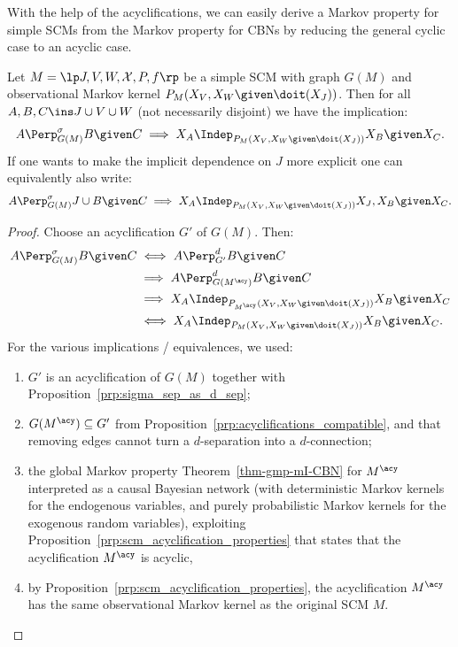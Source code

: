 With the help of the acyclifications,
we can easily derive a Markov property for simple SCMs from the Markov property for CBNs by reducing
the general cyclic case to an acyclic case.
\begin{Cor}\label{cor:gmp_simple_scm}
  Let $M = \lt \Sin, \Send, \Srnd, \CX, P, f \rt$ be a simple SCM with graph $G(M)$
  and observational Markov kernel $P_{M}(X_V,X_W \given \doit(X_J))$.
  Then for all $A, B, C \ins J \cup V \cup W$ (not necessarily disjoint) we have the implication:
  $$A \Perp^\sigma_{G(M)} B \given C \implies X_A \Indep_{P_{M}(X_V,X_W \given \doit(\XJ))} X_B \given X_C.$$
  If one wants to make the implicit dependence on $J$ more explicit one can equivalently also write:
  $$A \Perp^\sigma_{G(M)} J \cup B \given C \implies X_A \Indep_{P_{M}(X_V,X_W \given \doit(\XJ))} X_J,X_B \given X_C.$$
\end{Cor}
\begin{proof}
  Choose an acyclification $G'$ of $G(M)$. Then:
  \begin{equation*}\begin{split}
    A \Perp^\sigma_{G(M)} B \given C 
    & \iff A \Perp^d_{G'} B \given C \\
    & \implies A \Perp^d_{G(M^\acy)} B \given C \\
    & \implies X_A \Indep_{P_{M^\acy}(X_V,X_W \given \doit(\XJ))} X_B \given X_C \\
    & \iff X_A \Indep_{P_{M}(X_V,X_W \given \doit(\XJ))} X_B \given X_C.
  \end{split}\end{equation*}
  For the various implications / equivalences, we used:
  \begin{enumerate}
    \item $G'$ is an acyclification of $G(M)$ together with Proposition~\ref{prp:sigma_sep_as_d_sep}; 
    \item $G(M^\acy) \subseteq G'$ from Proposition~\ref{prp:acyclifications_compatible}, and that removing edges cannot turn a $d$-separation into a $d$-connection; 
    \item the global Markov property Theorem~\ref{thm-gmp-mI-CBN} for $M^\acy$ interpreted as a causal Bayesian network (with deterministic Markov kernels for the endogenous variables, and purely probabilistic Markov kernels for the exogenous random variables), exploiting Proposition~\ref{prp:scm_acyclification_properties} that states that the acyclification $M^\acy$ is acyclic,
    \item by Proposition~\ref{prp:scm_acyclification_properties}, the acyclification $M^\acy$ has the same observational Markov kernel as the original SCM $M$.
  \end{enumerate}
\end{proof}
